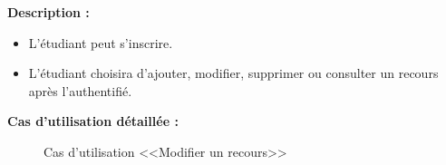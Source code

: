 \documentclass[12pt]{report}
\begin{document}
\vspace{-0.15in}

\textbf{Description :}

\begin{itemize}
    \item L'étudiant peut s'inscrire.
    \item L'étudiant choisira d'ajouter, modifier, supprimer ou consulter un recours après l’authentifié.
\end{itemize}

\textbf{Cas d'utilisation détaillée :}

\vspace*{0.1in}

\begin{figure}[h]
\centering
    \centerline{}
    \caption{Cas d'utilisation <<Modifier un recours>>}
\end{figure}

\vspace*{-0.1in}
\end{document}
